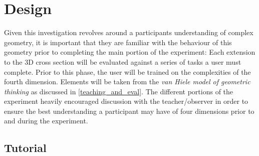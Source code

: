 \documentclass{l4proj}
\begin{document}
\chapter{Design}

Given this investigation revolves around a participants understanding of complex geometry, it is important that they are familiar with the behaviour of this geometry prior to completing the main portion of the experiment:
Each extension to the 3D cross section will be evaluated against a series of tasks a user must complete. Prior to this phase, the user will be trained on the complexities of the fourth dimension. Elements will be taken from the \textit{van Hiele model of geometric thinking} as discussed in \cref{teaching_and_eval}. 
%
The different portions of the experiment heavily encouraged discussion with the teacher/observer in order to ensure the best understanding a participant may have of four dimensions prior to and during the experiment.

\section{Tutorial}
\label{tutorial}
\end{document}
